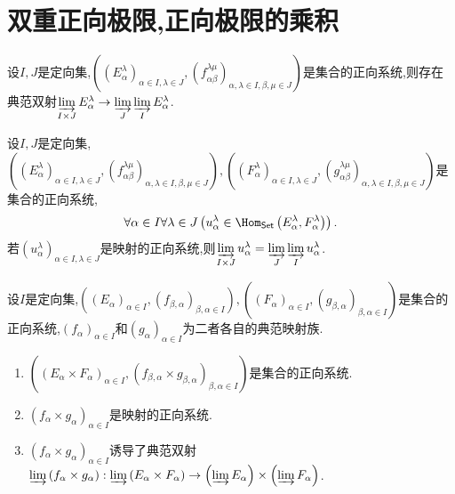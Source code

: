 \section{双重正向极限,正向极限的乘积}

\begin{proposition}{}{}
	设$I,J$是定向集,$\left(\left(E_{\alpha}^{\lambda}\right)_{\alpha\in I,\lambda\in J},\left(f_{\alpha\beta}^{\lambda\mu}\right)_{\alpha,\lambda\in I,\beta,\mu\in J}\right)$是集合的正向系统,则存在典范双射$\varinjlim\limits_{I\times J}E_{\alpha}^{\lambda}\to\varinjlim\limits_{J}\varinjlim\limits_{I}E_{\alpha}^{\lambda}$.
\end{proposition}

\begin{corollary}{}{}
	设$I,J$是定向集,$\left(\left(E_{\alpha}^{\lambda}\right)_{\alpha\in I,\lambda\in J},\left(f_{\alpha\beta}^{\lambda\mu}\right)_{\alpha,\lambda\in I,\beta,\mu\in J}\right),\left(\left(F_{\alpha}^{\lambda}\right)_{\alpha\in I,\lambda\in J},\left(g_{\alpha\beta}^{\lambda\mu}\right)_{\alpha,\lambda\in I,\beta,\mu\in J}\right)$是集合的正向系统,
	\begin{align*}
		\forall\alpha\in I\forall\lambda\in J\left(u_{\alpha}^{\lambda}\in\Hom_{\mathsf{Set}}\left(E_{\alpha}^{\lambda},F_{\alpha}^{\lambda}\right)\right).
	\end{align*}
	若$\left(u_{\alpha}^{\lambda}\right)_{\alpha\in I,\lambda\in J}$是映射的正向系统,则$\varinjlim\limits_{I\times J}u_{\alpha}^{\lambda}=\varinjlim\limits_{J}\varinjlim\limits_{I}u_{\alpha}^{\lambda}$.
\end{corollary}

\begin{proposition}{}{}
	设$I$是定向集,$\left(\left(E_{\alpha}\right)_{\alpha\in I},\left(f_{\beta,\alpha}\right)_{\beta,\alpha\in I}\right),\left(\left(F_{\alpha}\right)_{\alpha\in I},\left(g_{\beta,\alpha}\right)_{\beta,\alpha\in I}\right)$是集合的正向系统,$\left(f_{\alpha}\right)_{\alpha\in I}$和$\left(g_{\alpha}\right)_{\alpha\in I}$为二者各自的典范映射族.
	\begin{enumerate}
		\item $\left(\left(E_{\alpha}\times F_{\alpha}\right)_{\alpha\in I},\left(f_{\beta,\alpha}\times g_{\beta,\alpha}\right)_{\beta,\alpha\in I}\right)$是集合的正向系统.
		\item $\left(f_{\alpha}\times g_{\alpha}\right)_{\alpha\in I}$是映射的正向系统.
		\item $\left(f_{\alpha}\times g_{\alpha}\right)_{\alpha\in I}$诱导了典范双射$\varinjlim\left(f_{\alpha}\times g_{\alpha}\right):\varinjlim\left(E_{\alpha}\times F_{\alpha}\right)\to\left(\varinjlim E_{\alpha}\right)\times\left(\varinjlim F_{\alpha}\right)$.
	\end{enumerate}
\end{proposition}

